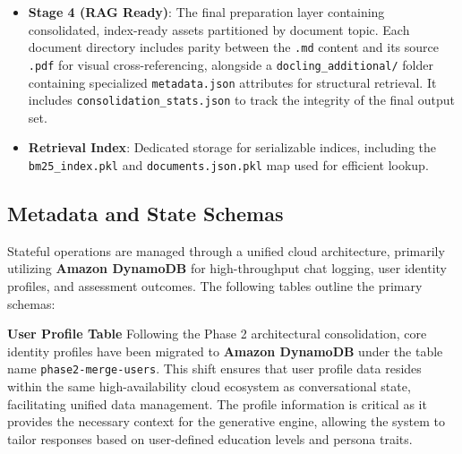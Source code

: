 \begin{itemize}
\begin{itemize}
\begin{itemize}
        \end{itemize}
        \item \textbf{Stage 4 (RAG Ready)}: The final preparation layer containing consolidated, index-ready assets partitioned by document topic. Each document directory includes parity between the \texttt{.md} content and its source \texttt{.pdf} for visual cross-referencing, alongside a \texttt{docling\_additional/} folder containing specialized \texttt{metadata.json} attributes for structural retrieval. It includes \texttt{consolidation\_stats.json} to track the integrity of the final output set.
        \item \textbf{Retrieval Index}: Dedicated storage for serializable indices, including the \texttt{bm25\_index.pkl} and \texttt{documents.json.pkl} map used for efficient lookup.
    \end{itemize}
\end{itemize}

\subsection{Metadata and State Schemas}
Stateful operations are managed through a unified cloud architecture, primarily utilizing \textbf{Amazon DynamoDB} for high-throughput chat logging, user identity profiles, and assessment outcomes. The following tables outline the primary schemas:

\textbf{User Profile Table}
Following the Phase 2 architectural consolidation, core identity profiles have been migrated to \textbf{Amazon DynamoDB} under the table name \texttt{phase2-merge-users}. This shift ensures that user profile data resides within the same high-availability cloud ecosystem as conversational state, facilitating unified data management. The profile information is critical as it provides the necessary context for the generative engine, allowing the system to tailor responses based on user-defined education levels and persona traits.

